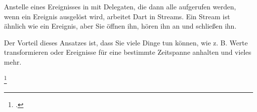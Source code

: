Anstelle eines Ereignisses in \Csharp mit Delegaten, die dann alle aufgerufen werden, wenn ein Ereignis ausgelöst wird, arbeitet Dart in Streams. Ein Stream ist ähnlich wie ein Ereignis, aber Sie öffnen ihn, hören ihn an und schließen ihn.

Der Vorteil dieses Ansatzes ist, dass Sie viele Dinge tun können, wie z. B. Werte transformieren oder Ereignisse für eine bestimmte Zeitspanne anhalten und vieles mehr. 

\begin{minipage}{\linewidth}

\end{minipage}
\footcitetext[In Anlehnung an ][Abgerufen am \today]{Pedley2019}


